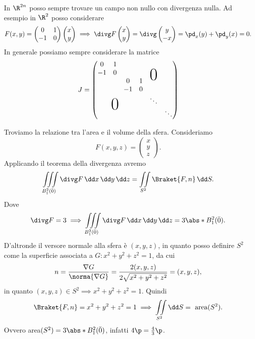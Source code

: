 \begin{oss}
	In \(\R^{2n}\) posso sempre trovare un campo non nullo con divergenza nulla.
	Ad esempio in \(\R^2\) posso considerare
	\[
		F(x,y) = 	\begin{pmatrix}
			0  & 1 \\
			-1 & 0
		\end{pmatrix} \begin{pmatrix}x\\y\end{pmatrix}
		\implies \divg F \begin{pmatrix}x\\y\end{pmatrix} = \divg \begin{pmatrix}y\\-x\end{pmatrix} = \pd_x(y) + \pd_y (x) = 0.
	\]
	In generale possiamo sempre considerare la matrice
	\[
		J = \begin{pmatrix}
			0  & 1                            &    &   &                              &        \\
			-1 & 0                            &    &   & \makebox(0,0){\text{\Huge0}} &        \\
			   &                              & 0  & 1 &                              &        \\
			   &                              & -1 & 0 &                              &        \\
			   & \makebox(0,0){\text{\Huge0}} &    &   & \ddots                       &        \\
			   &                              &    &   &                              & \ddots
		\end{pmatrix}
	\]
\end{oss}

\begin{ese}
	Troviamo la relazione tra l'area e il volume della sfera.
	Consideriamo
	\[
		F(x,y,z) = \begin{pmatrix}x\\y\\z\end{pmatrix}.
	\]
	Applicando il teorema della divergenza avremo
	\[
		\iiint\limits_{B_1^2(\bar{0})}\divg F\,\dd x\,\dd y\,\dd z = \iint\limits_{S^2} \Braket{F,n}\,\dd S.
	\]
	Dove
	\[
		\divg F = 3 \implies \iiint\limits_{B_1^2(\bar{0})}\divg F\,\dd x\,\dd y\,\dd z = 3 \abs*{B_1^2(\bar{0})}.
	\]
	D'altronde il versore normale alla sfera è \((x,y,z)\), in quanto posso definire \(S^2\) come la superficie associata a \(G\colon x^2+y^2+z^2=1\), da cui
	\[
		n = \frac{\nabla G}{\norma{\nabla G}} = \frac{2(x,y,z)}{2\sqrt{x^2+y^2+z^2}} = (x,y,z),
	\]
	in quanto \((x,y,z)\in S^2 \implies x^2+y^2+z^2 = 1\).
	Quindi
	\[
		\Braket{F,n} = x^2+y^2+z^2 = 1 \implies \iint\limits_{S^2} \dd S = \text{ area}(S^2).
	\]
	Ovvero area\((S^2) = 3\abs*{B_1^2(\bar{0})}\), infatti \(4\p = \frac{4}{3}\p\).
\end{ese}

